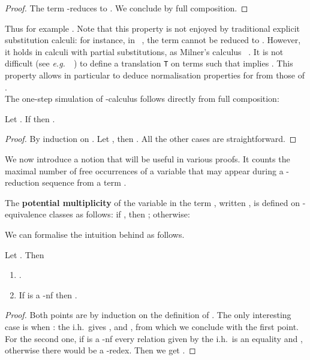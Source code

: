\documentclass{LMCS}
\newcommand{\eg}{{\it  e.g.}~}
\renewcommand{\>}{\rightarrow}
\newcommand{\ih}{i.h.}
\newcommand{\deft}[1]{{\bf #1}}
\begin{document}
\begin{proof}
The term   -reduces to 
. We conclude
by full composition.
\end{proof}

 Thus for example .  Note that this property is not enjoyed by
  traditional explicit substitution calculi: for instance, in
  ~\cite{BlooRoselx}, the term  cannot be reduced to
  .  However, it holds in
  calculi with partial substitutions, as Milner's calculus ~\cite{Milner07}. It is not
  difficult (see \eg~\cite{OConchuirKesner}) to define a translation
  {\tt T} on terms such that  implies .  This property allows in particular to
  deduce normalisation properties for   from those  of  .  \\

The one-step simulation of -calculus follows directly from full composition:

\begin{lem}
\label{l:l-sim}
Let .  If  then  .
\end{lem}

\begin{proof}
By induction on .
Let  , then  . All the other cases are straightforward.
\end{proof}


We now introduce a notion that will be useful in various proofs. 
It counts the maximal number of free occurrences of a variable  that may appear during
a -reduction sequence from a term . 

The \deft{potential multiplicity} of the variable  in the term , written , 
is defined on -equivalence classes as follows:  
if  , then 
; otherwise:

We can formalise the intuition behind  as follows.

\begin{lem}
\label{l:mul-occ} Let .   Then 
\begin{enumerate}[\rm(1)]
\item \label{l:mo-one}.
\item If  is a -nf then .
\end{enumerate}
\end{lem}

\begin{proof}
Both points  are by induction  on the definition of  . The
only  interesting  case  is  when  : the  \ih\  gives
,                        and
, from which we conclude with the first point. 
For the second one, if  is a -nf
every   relation   given   by    the   \ih\   is   an   equality   and
,    otherwise    there    would    be    a
-redex.                Then               we               get
.
\end{proof}
\end{document}

